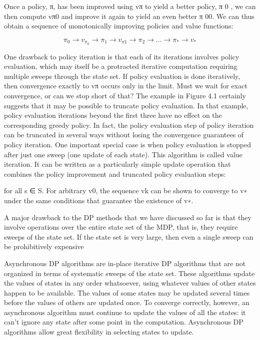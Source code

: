 Once a policy, π, has been improved using vπ to yield a better policy, π
0
, we can then compute vπ0 and
improve it again to yield an even better π
00. We can thus obtain a sequence of monotonically improving
policies and value functions:

$$\pi_0 \longrightarrow v_{\pi_0} \longrightarrow \pi_1 \longrightarrow v_{\pi{1}} \longrightarrow \pi_2 \longrightarrow \dots \longrightarrow \pi_* \longrightarrow v_*$$


One drawback to policy iteration is that each of its iterations involves policy evaluation, which may
itself be a protracted iterative computation requiring multiple sweeps through the state set. If policy
evaluation is done iteratively, then convergence exactly to vπ occurs only in the limit. Must we wait
for exact convergence, or can we stop short of that? The example in Figure 4.1 certainly suggests that
it may be possible to truncate policy evaluation. In that example, policy evaluation iterations beyond
the first three have no effect on the corresponding greedy policy.
In fact, the policy evaluation step of policy iteration can be truncated in several ways without losing
the convergence guarantees of policy iteration. One important special case is when policy evaluation
is stopped after just one sweep (one update of each state). This algorithm is called value iteration. It
can be written as a particularly simple update operation that combines the policy improvement and
truncated policy evaluation steps:



for all s ∈ S. For arbitrary v0, the sequence {vk} can be shown to converge to v∗ under the same
conditions that guarantee the existence of v∗.



A major drawback to the DP methods that we have discussed so far is that they involve operations
over the entire state set of the MDP, that is, they require sweeps of the state set. If the state set is very
large, then even a single sweep can be prohibitively expensive


Asynchronous DP algorithms are in-place iterative DP algorithms that are not organized in terms
of systematic sweeps of the state set. These algorithms update the values of states in any order
whatsoever, using whatever values of other states happen to be available. The values of some states
may be updated several times before the values of others are updated once. To converge correctly,
however, an asynchronous algorithm must continue to update the values of all the states: it can’t ignore
any state after some point in the computation. Asynchronous DP algorithms allow great flexibility in
selecting states to update.

